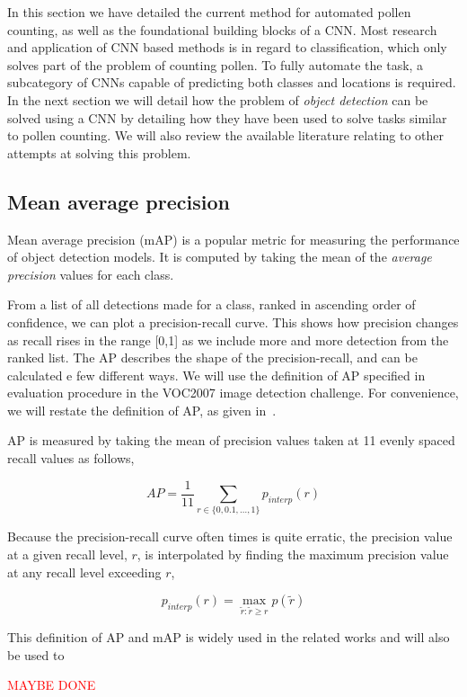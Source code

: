 In this section we have detailed the current method for automated pollen counting, as well as the foundational building blocks of a CNN\@.
Most research and application of CNN based methods is in regard to classification, which only solves part of the problem of counting pollen.
To fully automate the task, a subcategory of CNNs capable of predicting both classes and locations is required.
In the next section we will detail how the problem of \textit{object detection} can be solved using a CNN by detailing how they have been used to solve tasks similar to pollen counting.
We will also review the available literature relating to other attempts at solving this problem.

\subsection{Mean average precision}
Mean average precision (mAP) is a popular metric for measuring the performance of object detection models.
It is computed by taking the mean of the \textit{average precision} values for each class.

From a list of all detections made for a class, ranked in ascending order of confidence, we can plot a precision-recall curve.
This shows how precision changes as recall rises in the range [0,1] as we include more and more detection from the ranked list. 
The AP describes the shape of the precision-recall, and can be calculated e few different ways.
We will use the definition of AP specified in evaluation procedure in the VOC2007 image detection challenge. 
For convenience, we will restate the definition of AP, as given in~\cite{everingham2010pascal}.

AP is measured by taking the mean of precision values taken at 11 evenly spaced recall values as follows,

\begin{equation}\label{eq:average-precision}
  AP=\frac{1}{11} \sum_{r\in \{0,0.1,\dots,1\}}p_{interp}(r)
\end{equation}

Because the precision-recall curve often times is quite erratic, the precision value at a given recall level, \(r\), is interpolated by finding the maximum precision value at any recall level exceeding \(r\),

\begin{equation*}
  p_{interp}(r)=\max_{\tilde{r}:\tilde{r}\geq r}p(\tilde{r})
\end{equation*}

This definition of AP and mAP is widely used in the related works and will also be used to 

\textcolor{red}{MAYBE DONE}